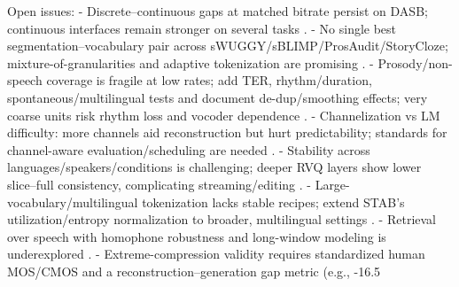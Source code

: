 \documentclass{article}
\begin{document}
Open issues:
- Discrete--continuous gaps at matched bitrate persist on DASB; continuous interfaces remain stronger on several tasks \cite{mousavi2024dasbdiscreteaudiospeechbenchmark}.
- No single best segmentation--vocabulary pair across sWUGGY/sBLIMP/ProsAudit/StoryCloze; mixture-of-granularities and adaptive tokenization are promising \cite{kando2025exploringeffectsegmentationvocabularysiz}.
- Prosody/non-speech coverage is fragile at low rates; add TER, rhythm/duration, spontaneous/multilingual tests and document de-dup/smoothing effects; very coarse units risk rhythm loss and vocoder dependence \cite{onda2025benchmarkingprosodyencodingdiscretespeec,baade2024syllablelmlearningcoarsesemanticunitsspe}.
- Channelization vs LM difficulty: more channels aid reconstruction but hurt predictability; standards for channel-aware evaluation/scheduling are needed \cite{ji2025languagecodecbridgingdiscreterepresentat}.
- Stability across languages/speakers/conditions is challenging; deeper RVQ layers show lower slice--full consistency, complicating streaming/editing \cite{vashishth2024stabspeechtokenizerassessmentbenchmark,maimon2025salmonsuiteacousticlanguagemodelevaluati,cui2025voxevalbenchmarkingknowledgeunderstandin,entry2025indicsuperbspeechprocessinguniversalperf}.
- Large-vocabulary/multilingual tokenization lacks stable recipes; extend STAB's utilization/entropy normalization to broader, multilingual settings \cite{vashishth2024stabspeechtokenizerassessmentbenchmark}.
- Retrieval over speech with homophone robustness and long-window modeling is underexplored \cite{min2025speechretrievalaugmentedgenerationwithou,onda2025benchmarkingprosodyencodingdiscretespeec,maimon2025salmonsuiteacousticlanguagemodelevaluati,entry2025indicsuperbspeechprocessinguniversalperf}.
- Extreme-compression validity requires standardized human MOS/CMOS and a reconstruction--generation gap metric (e.g., -16.5%
\end{document}
